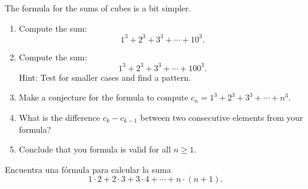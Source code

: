 The formula for the sums of cubes is a bit simpler.
\begin{exercise}
\begin{enumerate}
    \item Compute the sum: $$1^3+2^3+3^3+\cdots+10^3.$$
    \item Compute the sum: $$1^3+2^3+3^3+\cdots+100^3.$$ Hint: Test for smaller cases and find a pattern.
    \item Make a conjecture for the formula to compute $c_n = 1^3+2^3+3^3+\cdots+n^3$. 
    \item What is the difference $c_k-c_{k-1}$ between two consecutive elements from your formula?
    \item Conclude that you formula is valid for all $n\geq 1$.
\end{enumerate}
\end{exercise}
\tutpagebreak

\begin{exercise}
Encuentra una fórmula para calcular la suma $$1\cdot2+2\cdot3+3\cdot4+\cdots+n\cdot(n+1).$$
\end{exercise}
\tutpagebreak

